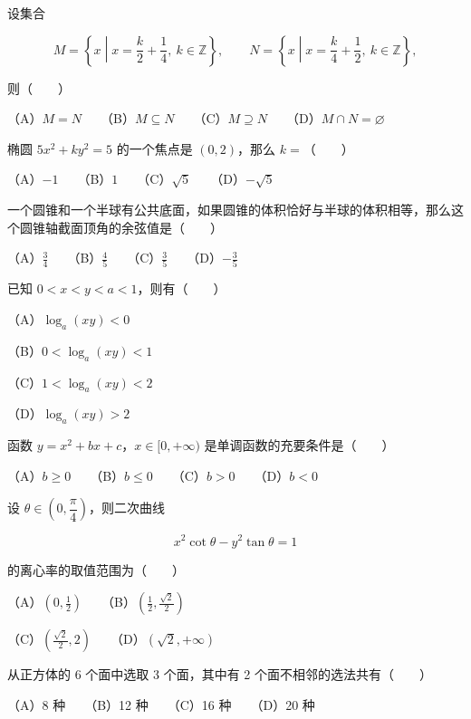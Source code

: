 \begin{question}
设集合

\nopagebreak[4]
\[
M=\left\{x\middle|x=\frac{k}{2}+\frac14,\ k\in\mathbb Z\right\},\qquad
N=\left\{x\middle|x=\frac{k}{4}+\frac12,\ k\in\mathbb Z\right\},
\]

则\mbox{（　　）}

（A）$M=N$　　（B）$M\subseteq N$　　（C）$M\supseteq N$　　（D）$M\cap N=\varnothing$

\end{question}
\begin{question}
椭圆 $5x^2+ky^2=5$ 的一个焦点是 $(0,2)$，那么 $k=$\mbox{（　　）}

（A）$-1$　　（B）$1$　　（C）$\sqrt5$　　（D）$-\sqrt5$

\end{question}
\begin{question}
一个圆锥和一个半球有公共底面，如果圆锥的体积恰好与半球的体积相等，那么这个圆锥轴截面顶角的余弦值是\mbox{（　　）}

（A）$\frac34$　　（B）$\frac45$　　（C）$\frac35$　　（D）$-\frac35$

\end{question}
\begin{question}
已知 $0<x<y<a<1$，则有\mbox{（　　）}

（A）$\log_a(xy)<0$

（B）$0<\log_a(xy)<1$

（C）$1<\log_a(xy)<2$

（D）$\log_a(xy)>2$

\end{question}
\begin{question}
函数 $y=x^2+bx+c$，$x\in[0,+\infty)$ 是单调函数的充要条件是\mbox{（　　）}

（A）$b\geqslant0$　　（B）$b\leqslant0$　　（C）$b>0$　　（D）$b<0$

\end{question}
\begin{question}
设 $\theta\in\left(0,\dfrac\pi4\right)$，则二次曲线

\nopagebreak[4]
\[
x^2\cot\theta-y^2\tan\theta=1
\]

的离心率的取值范围为\mbox{（　　）}

（A）$\left(0,\frac12\right)$　　（B）$\left(\frac12,\frac{\sqrt2}{2}\right)$

（C）$\left(\frac{\sqrt2}{2},2\right)$　　（D）$(\sqrt2,+\infty)$

\end{question}
\begin{question}
从正方体的 6 个面中选取 3 个面，其中有 2 个面不相邻的选法共有\mbox{（　　）}

（A）8 种　　（B）12 种　　（C）16 种　　（D）20 种

\end{question}

